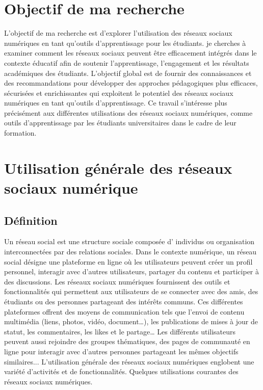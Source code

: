 \documentclass[12pt,a4paper,titlepage]{article}
\begin{document}
\section{Objectif de ma recherche }
L'objectif de ma recherche est d'explorer l'utilisation des réseaux sociaux numériques en tant qu'outils d'apprentissage pour les étudiants. je cherches à examiner comment les réseaux sociaux peuvent être efficacement intégrés dans le contexte éducatif afin de soutenir l'apprentissage, l'engagement et les résultats académiques des étudiants. L'objectif global est de fournir des connaissances et des recommandations pour développer des approches pédagogiques plus efficaces, sécurisées et enrichissantes qui exploitent le potentiel des réseaux sociaux numériques en tant qu'outils d'apprentissage. Ce travail  s’intéresse plus précisément aux différentes utilisations des réseaux sociaux numériques, comme outils  d’apprentissage par les étudiants universitaires dans le cadre de leur formation. \newline
\section{Utilisation générale des réseaux sociaux numérique }
\subsection{Définition}
Un réseau social est une structure sociale composée d' individus ou organisation interconnectées par des relations sociales.\newline
Dans le contexte numérique, un réseau social désigne une plateforme en ligne où les utilisateurs peuvent créer un profil personnel, interagir avec d'autres utilisateurs, partager du contenu et participer à des discussions. \newline
Les réseaux sociaux numériques fournissent des outils et fonctionnalités qui permettent aux utilisateurs de se connecter avec des amis, des étudiants ou  des personnes partageant des intérêts communs. Ces différentes plateformes offrent des moyens de communication tels que l'envoi de contenu multimédia (liens, photos, vidéo, document…), les publications de mises à jour de statut, les commentaires, les likes et le partage… \newline
Les différents utilisateurs peuvent aussi rejoindre des groupes thématiques, des pages de communauté en ligne pour interagir avec d'autres personnes partageant les mêmes objectifs similaires...\newline
L'utilisation générale des réseaux sociaux numériques englobent une variété d'activités et de fonctionnalités.  Quelques utilisations courantes des réseaux sociaux numériques. \newline
\end{document}
